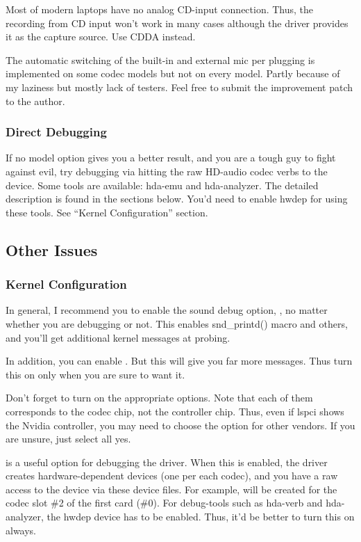 \documentclass[a4paper,8pt,english]{sphinxmanual}
\begin{document}
Most of modern laptops have no analog CD-input connection.  Thus, the
recording from CD input won't work in many cases although the driver
provides it as the capture source.  Use CDDA instead.

The automatic switching of the built-in and external mic per plugging
is implemented on some codec models but not on every model.  Partly
because of my laziness but mostly lack of testers.  Feel free to
submit the improvement patch to the author.


\subsubsection{Direct Debugging}
\label{sound/hd-audio/notes:direct-debugging}
If no model option gives you a better result, and you are a tough guy
to fight against evil, try debugging via hitting the raw HD-audio
codec verbs to the device.  Some tools are available: hda-emu and
hda-analyzer.  The detailed description is found in the sections
below.  You'd need to enable hwdep for using these tools.  See ``Kernel
Configuration'' section.


\subsection{Other Issues}
\label{sound/hd-audio/notes:other-issues}

\subsubsection{Kernel Configuration}
\label{sound/hd-audio/notes:kernel-configuration}
In general, I recommend you to enable the sound debug option,
, no matter whether you are debugging or not.
This enables snd\_printd() macro and others, and you'll get additional
kernel messages at probing.

In addition, you can enable .  But this
will give you far more messages.  Thus turn this on only when you are
sure to want it.

Don't forget to turn on the appropriate 
options.  Note that each of them corresponds to the codec chip, not
the controller chip.  Thus, even if lspci shows the Nvidia controller,
you may need to choose the option for other vendors.  If you are
unsure, just select all yes.

 is a useful option for debugging the driver.
When this is enabled, the driver creates hardware-dependent devices
(one per each codec), and you have a raw access to the device via
these device files.  For example,  will be created for the
codec slot \#2 of the first card (\#0).  For debug-tools such as
hda-verb and hda-analyzer, the hwdep device has to be enabled.
Thus, it'd be better to turn this on always.
\end{document}
